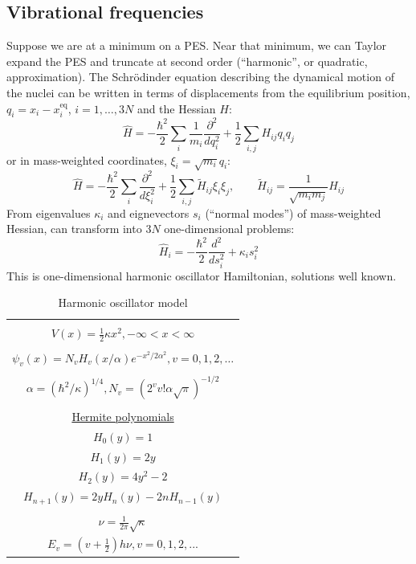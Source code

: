 \documentclass[11pt]{article}
\begin{document}
\subsection{Vibrational frequencies}
\label{sec:org26afb86}
Suppose we are at a minimum on a PES.  Near that minimum, we can Taylor expand the PES and truncate at second order (``harmonic'', or quadratic, approximation).  The Schr\"{o}dinder equation describing the dynamical motion of the nuclei can be written in terms of displacements from the equilibrium position, \(q_i = x_i - x^\text{eq}_i\), \(i =1, \ldots, 3N\) and the Hessian \(H\):
\[\hat{H} = -\frac{\hbar^2}{2}\sum_i \frac{1}{m_i}\frac{\partial^2}{dq_i^2}+\frac{1}{2}\sum_{i,j} H_{ij} q_i q_j\]
or in mass-weighted coordinates, \(\xi_i=\sqrt{m_i}q_i\):
\[ \hat{H} = -\frac{\hbar^2}{2}\sum_i \frac{\partial^2}{d\xi_i^2}+\frac{1}{2}\sum_{i,j} \tilde{H}_{ij} \xi_i \xi_j,\qquad \tilde{H}_{ij}=\frac{1}{\sqrt{m_i m_j}}H_{ij} \]
From eigenvalues \(\kappa_i\) and eignevectors \(s_i\) (``normal modes'') of mass-weighted Hessian, can transform into \(3N\) one-dimensional problems:
\[\hat{H}_i=-\frac{\hbar^2}{2}\frac{d^2}{ds_i^2}+\kappa_is_i^2\]
This is one-dimensional harmonic oscillator Hamiltonian, solutions well known.
\begin{table}[]
   \begin{center}
   \caption{Harmonic oscillator model}
    \label{Harmonic-oscillator}
\begin{tabular}[h]{|c|}
\hline
 \\
$\displaystyle       V(x) = \frac{1}{2} \kappa x^2, -\infty < x < \infty $ \\
 \\
$\displaystyle     \psi_v(x) = N_v H_v(x/\alpha)e^{-x^2/2\alpha^2}, v = 0, 1, 2, \ldots $ \\
\\
$\displaystyle \alpha=(\hbar^2/\kappa)^{1/4}, N_v=(2^vv!\alpha\sqrt{\pi})^{-1/2} $ \\
 \\
\underline{Hermite polynomials} \\
$\displaystyle H_0(y) =1$\\
$\displaystyle H_1(y) = 2y$\\
$\displaystyle H_2(y) = 4y^2-2$\\
$\displaystyle H_{n+1}(y) = 2 y H_n(y) -2 n H_{n-1}(y)$\\
 \\
$\displaystyle     \nu =\frac{1}{2\pi}\sqrt{\kappa}$ \\
$\displaystyle     E_v=\left (v+\frac{1}{2}\right )h \nu, v=0, 1, 2, ...$ \\
\hline
\end{tabular}
 \end{center}
\end{table}
\end{document}
